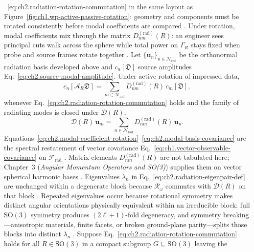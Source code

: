 ~\eqref{eq:ch2.radiation-rotation-commutation} in the same layout as
Figure~\ref{fig:ch1.wp-active-passive-rotation}: geometry and components must be rotated
consistently before modal coefficients are compared \cite{stratton1941}. Under rotation, modal coefficients mix through the matrix $D^{(\mathrm{rad})}_{nm}(R)$: an
engineer sees principal cuts walk across the sphere while total power on $\Gamma_R$ stays fixed
when probe and source frames rotate together \cite{harrington2001}. Let \(\{\mathbf{u}_n\}_{n\in\mathcal{N}_{\mathrm{rad}}}\) be the orthonormal radiation
basis developed above and \(c_n[\mathfrak{D}]\) source amplitudes
Eq.~\eqref{eq:ch2.source-modal-amplitude}. Under active rotation of impressed data,
\begin{equation}
\label{eq:ch2.modal-coefficient-rotation}
c_n[\mathcal{A}_R\mathfrak{D}]
=
\sum_{m\in\mathcal{N}_{\mathrm{rad}}}
D^{(\mathrm{rad})}_{nm}(R)\,c_m[\mathfrak{D}],
\end{equation}
whenever Eq.~\eqref{eq:ch2.radiation-rotation-commutation} holds and the family of radiating modes is
closed under \(\mathcal{D}(R)\),
\begin{equation}
\label{eq:ch2.modal-basis-covariance}
\mathcal{D}(R)\,\mathbf{u}_m
=
\sum_{n\in\mathcal{N}_{\mathrm{rad}}}
D^{(\mathrm{rad})}_{nm}(R)\,\mathbf{u}_n.
\end{equation}
Equations~\eqref{eq:ch2.modal-coefficient-rotation}--\eqref{eq:ch2.modal-basis-covariance}
are the spectral restatement of vector covariance
Eq.~\eqref{eq:ch1.vector-observable-covariance} on \(\mathcal{F}_{\mathrm{rad}}\)
\cite{stratton1941}. Matrix elements \(D^{(\mathrm{rad})}_{nm}(R)\) are not tabulated
here; Chapter~3 (\emph{Angular Momentum Operators and SO(3)}) supplies them on vector spherical harmonic bases
\cite{harrington2001}. Eigenvalues \(\lambda_n\) in
Eq.~\eqref{eq:ch2.radiation-eigenpair-def} are unchanged within a degenerate block because
\(\mathcal{R}_\omega\) commutes with \(\mathcal{D}(R)\) on that block
\cite{stratton1941}.
\label{thm:ch2.rotation-spectral-degeneracy}
Repeated eigenvalues occur because rotational symmetry makes distinct angular orientations
physically equivalent within an irreducible block: full $\mathrm{SO}(3)$ symmetry produces
$(2\ell+1)$-fold degeneracy, and symmetry breaking---anisotropic materials, finite facets,
or broken ground-plane parity---splits those blocks into distinct $\lambda_n$
\cite{stratton1941}. Suppose Eq.~\eqref{eq:ch2.radiation-rotation-commutation} holds for all
\(R\in\mathrm{SO}(3)\) in a compact subgroup \(G\subseteq\mathrm{SO}(3)\) leaving the
